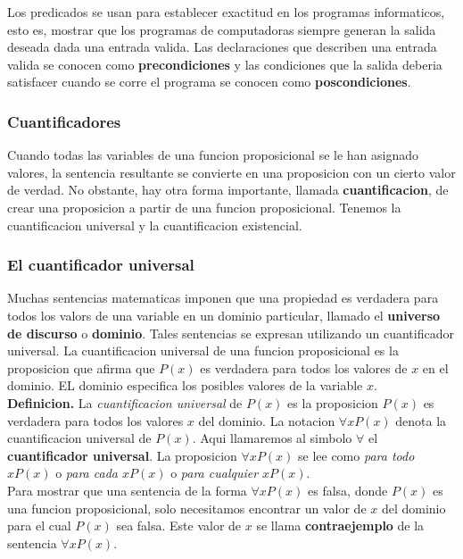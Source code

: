 \documentclass[]{article}
\begin{document}
Los predicados se usan para establecer exactitud en los programas informaticos, esto es, mostrar que los programas de computadoras siempre generan la salida deseada dada una entrada valida. Las declaraciones que describen una entrada valida se conocen como \textbf{precondiciones} y las condiciones que la salida deberia satisfacer cuando se corre el programa se conocen como \textbf{poscondiciones}.

\subsubsection*{Cuantificadores}

Cuando todas las variables de una funcion proposicional se le han asignado valores, la sentencia resultante se convierte en una proposicion con un cierto valor de verdad. No obstante, hay otra forma importante, llamada \textbf{cuantificacion}, de crear una proposicion a partir de una funcion proposicional. Tenemos la cuantificacion universal y la cuantificacion existencial.

\subsubsection*{El cuantificador universal}\label{sec:cuantificador-universal}

Muchas sentencias matematicas imponen que una propiedad es verdadera para todos los valors de una variable en un dominio particular, llamado el \textbf{universo de discurso} o \textbf{dominio}. Tales sentencias se expresan utilizando un cuantificador universal. La cuantificacion universal de una funcion proposicional es la proposicion que afirma que $P(x)$ es verdadera para todos los valores de $x$ en el dominio. EL dominio especifica los posibles valores de la variable $x$.\\

\textbf{Definicion.} La \textit{cuantificacion universal} de $P(x)$ es la proposicion $P(x)$ es verdadera para todos los valores $x$ del dominio. La notacion $\forall x P(x)$ denota la cuantificacion universal de $P(x)$. Aqui llamaremos al simbolo $\forall$ el \textbf{cuantificador universal}. La proposicion $\forall x P(x)$ se lee como \textit{para todo $x P(x)$} o \textit{para cada $x P(x)$} o \textit{para cualquier $x P(x)$}.\\

Para mostrar que una sentencia de la forma $\forall x P(x)$ es falsa, donde $P(x)$ es una funcion proposicional, solo necesitamos encontrar un valor de $x$ del dominio para el cual $P(x)$ sea falsa. Este valor de $x$ se llama \textbf{contraejemplo} de la sentencia $\forall x P(x)$.
\end{document}
